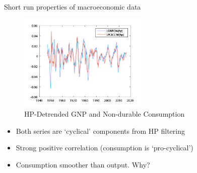 
\begin{frame}{Short run properties of macroeconomic data}

\begin{figure}
\caption[Detrended GNP and Consumption]{HP-Detrended GNP and Non-durable Consumption}
\centering
\label{fig:gnp_pce_hp_cycle}
\includegraphics[width=0.55\textwidth]{Figures/gnp_pce_hp_cycle.JPG}
\end{figure}
\begin{itemize}
\item	Both series are `cyclical' components from HP filtering
\item	Strong positive correlation (consumption is `pro-cyclical')
\item	Consumption smoother than output. Why?
\end{itemize}

\end{frame}


